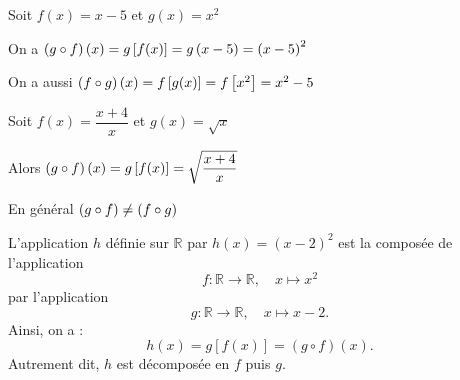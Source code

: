   \begin{example}
 
 Soit $ f(x)= x-5 $  et $ g(x)=x^{2} $
 
 
 On a $ \left(g\circ f\right)(x)=g\left[ f(x) \right]= g\left(x-5\right)=\left(x-5\right)^{2} $
 


  On a aussi $ \left(f\circ g\right)(x)=f\left[ g(x) \right]= f\left[ x^{2} \right]=x^{2}-5 $
 \end{example}

 
 \begin{example}
 
 Soit $ f(x)= \dfrac{x+4}{x} $  et $ g(x)=\sqrt{x} $

Alors \;  $ \left(g\circ f\right)(x)=g\left[ f(x) \right]= \sqrt{\dfrac{x+4}{x}} $
  \end{example}
 
 \begin{remark}
  En général $ \left(g\circ f\right) \neq  \left(f\circ g\right)$
 \end{remark}
 \begin{example}[Reconnaissance]
 
 L'application $h$ définie sur $\mathbb{R}$ par $h(x) = (x - 2)^2$ est la composée de l'application
\[
f : \mathbb{R} \longrightarrow \mathbb{R}, \quad x \longmapsto x^2
\]
par l'application
\[
g : \mathbb{R} \longrightarrow \mathbb{R}, \quad x \longmapsto x - 2.
\]
Ainsi, on a : 
\[
h(x) = g[f(x)] = (g \circ f)(x).
\]
Autrement dit, $h$ est décomposée en $f$ puis $g$.

 \end{example}

